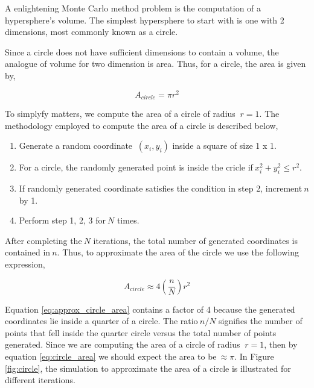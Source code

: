 \documentclass{article}
\begin{document}
A enlightening Monte Carlo method problem is the computation of a hypersphere's volume. The simplest hypersphere to start with is one with 2 dimensions, most
commonly known as a circle.

Since a circle does not have sufficient dimensions to contain a volume, the analogue of volume for two dimension is area. Thus, for a circle, the area is given
by,

\begin{equation} \label{eq:circle_area}
  A_{circle} = \pi r^2
\end{equation}

To simplyfy matters, we compute the area of a circle of radius $\ r = 1$. The methodology employed to compute the area of a circle is described below,

\begin{enumerate}
  \item Generate a random coordinate $\ (x_{i}, y_{i}) $ inside a square of size 1 x 1.
  \item For a circle, the randomly generated point is inside the cricle if$\ x_{i}^2 + y_{i}^2 \leq r^2$.
  \item If randomly generated coordinate satisfies the condition in step 2, increment$\ n $ by 1.
  \item Perform step 1, 2, 3 for$\ N $ times.
\end{enumerate}

After completing the$\ N $ iterations, the total number of generated coordinates is contained in$\ n$. Thus, to approximate the area of the circle we
use the following expression,

\begin{equation} \label{eq:approx_circle_area}
  A_{circle} \approx 4(\frac{n}{N})r^2
\end{equation}

Equation \ref{eq:approx_circle_area} contains a factor of 4 because the generated coordinates lie inside a quarter of a circle. The ratio$\ n/N$ signifies
the number of points that fell inside the quarter circle versus the total number of points generated. Since we are computing the area of a circle of radius
$\ r = 1$, then by equation \ref{eq:circle_area} we should expect the area to be$\ \approx \pi$. In Figure \ref{fig:circle}, the simulation to approximate
the area of a circle is illustrated for different iterations.
\end{document}
